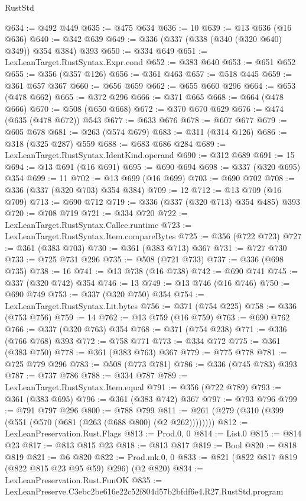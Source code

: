 \begin{lexlean}{RustStd}
\begin{coremodule}
@634 := @492 @449
@635 := @475 @634
@636 := 10
@639 := @13 @636 (@16 @636)
@640 := @342 @639
@649 := @336 (@337 (@338 (@340 (@320 @640) @349)) @354 @384) @393
@650 := @334 @649
@651 := LexLeanTarget.RustSyntax.Expr.cond
@652 := @383 @640
@653 := @651 @652
@655 := @356 (@357 @126)
@656 := @361 @463
@657 := @518 @445
@659 := @361 @657 @367
@660 := @656 @659
@662 := @655 @660 @296
@664 := @653 (@478 @662)
@665 := @372 @296
@666 := @371 @665
@668 := @664 (@478 @666)
@670 := @508 (@650 @668)
@672 := @370 @670 @629
@676 := @474 (@635 (@478 @672)) @543
@677 := @633 @676
@678 := @607 @677
@679 := @605 @678
@681 := @263 (@574 @679)
@683 := @311 (@314 @126)
@686 := @318 (@325 @287) @559
@688 := @683 @686 @284
@689 := LexLeanTarget.RustSyntax.IdentKind.operand
@690 := @312 @689
@691 := 15
@694 := @13 @691 (@16 @691)
@695 := @690 @694
@698 := @337 (@320 @695) @354
@699 := 11
@702 := @13 @699 (@16 @699)
@703 := @690 @702
@708 := @336 (@337 (@320 @703) @354 @384)
@709 := 12
@712 := @13 @709 (@16 @709)
@713 := @690 @712
@719 := @336 (@337 (@320 @713) @354 @485) @393
@720 := @708 @719
@721 := @334 @720
@722 := LexLeanTarget.RustSyntax.Callee.runtime
@723 := LexLeanTarget.RustSyntax.Item.compareBytes
@725 := @356 (@722 @723)
@727 := @361 (@383 @703)
@730 := @361 (@383 @713) @367
@731 := @727 @730
@733 := @725 @731 @296
@735 := @508 (@721 @733)
@737 := @336 (@698 @735)
@738 := 16
@741 := @13 @738 (@16 @738)
@742 := @690 @741
@745 := @337 (@320 @742) @354
@746 := 13
@749 := @13 @746 (@16 @746)
@750 := @690 @749
@753 := @337 (@320 @750) @354
@754 := LexLeanTarget.RustSyntax.Lit.bytes
@756 := @371 (@754 @225)
@758 := @336 (@753 @756)
@759 := 14
@762 := @13 @759 (@16 @759)
@763 := @690 @762
@766 := @337 (@320 @763) @354
@768 := @371 (@754 @238)
@771 := @336 (@766 @768) @393
@772 := @758 @771
@773 := @334 @772
@775 := @361 (@383 @750)
@778 := @361 (@383 @763) @367
@779 := @775 @778
@781 := @725 @779 @296
@783 := @508 (@773 @781)
@786 := @336 (@745 @783) @393
@787 := @737 @786
@788 := @334 @787
@789 := LexLeanTarget.RustSyntax.Item.equal
@791 := @356 (@722 @789)
@793 := @361 (@383 @695)
@796 := @361 (@383 @742) @367
@797 := @793 @796
@799 := @791 @797 @296
@800 := @788 @799
@811 := @261 (@279 (@310 (@399 (@551 (@570 (@681 (@263 (@688 @800) (@2 @262))))))))
@812 := LexLeanPreservation.Rust.Flags
@813 := Prod.{0, 0}
@814 := List.{0}
@815 := @814 @23
@817 := @813 @815 @23
@818 := @813 @817
@819 := Bool
@820 := @818 @819
@821 := @6 @820
@822 := Prod.mk.{0, 0}
@833 := @821 (@822 @817 @819 (@822 @815 @23 @95 @59) @296) (@2 @820)
@834 := LexLeanPreservation.Rust.FunOK
@835 := LexLeanPreserve.C3ebc2be616e22c52f804d57b2bfdf6e4.R27.RustStd.program

\end{coremodule}
\end{lexlean}
